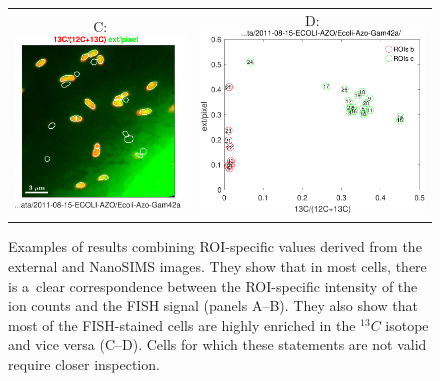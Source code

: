 \begin{figure}[!ht]
\begin{tabular}{cc}
C: \includegraphics[scale=\scf, valign=t]{figs7/13C-(12C+13C)-vs-ext-pixel-rgb}
&
D: \includegraphics[scale=\scf, valign=t]{figs7/13C-(12C+13C)-vs-ext-pixel}
\end{tabular}
\caption{\label{fig:LANS-ext-overlays}%
Examples of results combining ROI-specific values derived from the external and NanoSIMS images. They show that in most cells, there is a~clear correspondence between the ROI-specific intensity of the  ion counts and the FISH signal (panels A--B). They also show that most of the FISH-stained cells are highly enriched in the ${}^{13}C$ isotope and vice versa (C--D). Cells for which these statements are not valid require closer inspection.}
\end{figure}

